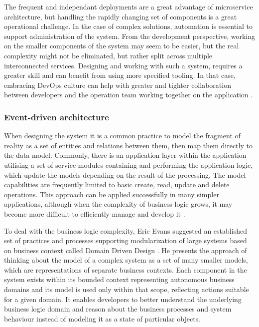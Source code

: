 The frequent and independant deployments are a great advantage of microservice architecture, but handling the rapidly changing set of components is a great operational challenge. In the case of complex solutions, automation is essential to support administration of the system. From the development perspective, working on the smaller components of the system may seem to be easier, but the real complexity might not be eliminated, but rather split across multiple interconnected services. Designing and working with such a system, requires a greater skill and can benefit from using more specified tooling. In that case, embracing DevOps culture can help with greater and tighter collaboration between developers and the operation team working together on the application \cite{FowlerMicroservicesTradeoffs}.

\subsubsection{Event-driven architecture} \label{chapter:event-driven-architecture}

When designing the system it is a common practice to model the fragment of reality as a set of entities and relations between them, then map them directly to the data model. Commonly, there is an application layer within the application utilising a set of service modules containing and performing the application logic, which update the models depending on the result of the processing. The model capabilities are frequently limited to basic create, read, update and delete operations. This approach can be applied successfully in many simpler applications, although when the complexity of business logic grows, it may become more difficult to efficiently manage and develop it \cite{FowlerAnemicModel}.

To deal with the business logic complexity, Eric Evans suggested an established set of practices and processes supporting modularization of large systems based on business context called Domain Driven Design \cite{EvansDDD}. He presents the approach of thinking about the model of a complex system as a set of many smaller models, which are representations of separate business contexts. Each component in the system exists within its bounded context representing autonomous business domains and its model is used only within that scope, reflecting actions suitable for a given domain. It enables developers to better understand the underlying business logic domain and reason about the business processes and system behaviour instead of modeling it as a state of particular objects.

